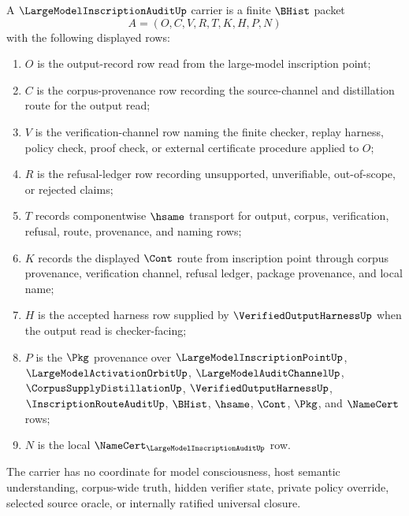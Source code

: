 \begin{definition}
\label{def:large-model-inscription-audit-carrier}
A $\LargeModelInscriptionAuditUp$ carrier is a finite $\BHist$ packet
$$
A=(O,C,V,R,T,K,H,P,N)
$$
with the following displayed rows:
\begin{enumerate}
\item $O$ is the output-record row read from the large-model inscription point;
\item $C$ is the corpus-provenance row recording the source-channel and distillation route for the output read;
\item $V$ is the verification-channel row naming the finite checker, replay harness, policy check, proof check, or external certificate procedure applied to $O$;
\item $R$ is the refusal-ledger row recording unsupported, unverifiable, out-of-scope, or rejected claims;
\item $T$ records componentwise $\hsame$ transport for output, corpus, verification, refusal, route, provenance, and naming rows;
\item $K$ records the displayed $\Cont$ route from inscription point through corpus provenance, verification channel, refusal ledger, package provenance, and local name;
\item $H$ is the accepted harness row supplied by $\VerifiedOutputHarnessUp$ when the output read is checker-facing;
\item $P$ is the $\Pkg$ provenance over $\LargeModelInscriptionPointUp$, $\LargeModelActivationOrbitUp$, $\LargeModelAuditChannelUp$, $\CorpusSupplyDistillationUp$, $\VerifiedOutputHarnessUp$, $\InscriptionRouteAuditUp$, $\BHist$, $\hsame$, $\Cont$, $\Pkg$, and $\NameCert$ rows;
\item $N$ is the local $\NameCert_{\LargeModelInscriptionAuditUp}$ row.
\end{enumerate}
The carrier has no coordinate for model consciousness, host semantic understanding, corpus-wide truth, hidden verifier state, private policy override, selected source oracle, or internally ratified universal closure.
\end{definition}

